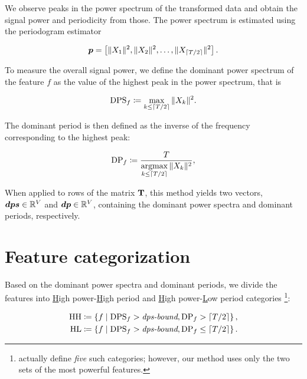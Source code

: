 We observe peaks in the power spectrum of the transformed data and obtain the signal power and periodicity from those. The power spectrum is estimated using the periodogram estimator

\begin{equation*}
	\vect{P} = \left[ \|X_{1}\|^{2}, \|X_{2}\|^{2}, \dots, \|X_{\ceil{\streamlen / 2}}\|^{2} \right].
\end{equation*}

To measure the overall signal power, we define the dominant power spectrum of the feature $f$ as the value of the highest peak in the power spectrum, that is

\begin{equation}
	\text{DPS}_{f} \coloneqq \max\limits_{k \leq \lceil T / 2\rceil}{\|X_{k}\|^{2}}.
\end{equation}

The dominant period is then defined as the inverse of the frequency corresponding to the highest peak:

\begin{equation}
	\text{DP}_{f} \coloneqq \frac{T}{\operatorname*{argmax}\limits_{k \leq \lceil T / 2\rceil}{\|X_{k}\|^{2}}},
\end{equation}

When applied to rows of the matrix $\mathbf{T}$, this method yields two vectors, $\vect{DPS} \in \R^{\featcount}$ and $\vect{DP} \in \R^{\featcount}$, containing the dominant power spectra and dominant periods, respectively.


\section{Feature categorization}
Based on the dominant power spectra and dominant periods, we divide the features into \underline{H}igh power-\underline{H}igh period and \underline{H}igh power-\underline{L}ow period categories \footnote{\cite{event-detection} actually define \textit{five} such categories; however, our method uses only the two sets of the most powerful features.}:

\begin{equation}
\begin{split}
	\text{HH} \coloneqq \left\{ f \mid \text{DPS}_{f} > \textit{dps-bound}, \text{DP}_{f} > \lceil T / 2\rceil \right\}, \\
	\text{HL} \coloneqq \left\{ f \mid \text{DPS}_{f} > \textit{dps-bound}, \text{DP}_{f} \leq \lceil T / 2\rceil \right\}.
\end{split}
\end{equation}

